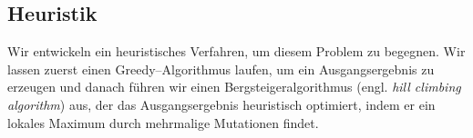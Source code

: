 \subsection{Heuristik}
Wir entwickeln ein heuristisches Verfahren, um diesem Problem zu begegnen. 
Wir lassen zuerst einen Greedy--Algorithmus laufen, um ein Ausgangsergebnis zu erzeugen und
danach führen wir einen Bergsteigeralgorithmus (engl. \textit{hill climbing algorithm}) aus,
der das Ausgangsergebnis heuristisch optimiert, indem er ein lokales Maximum durch mehrmalige
Mutationen findet.




